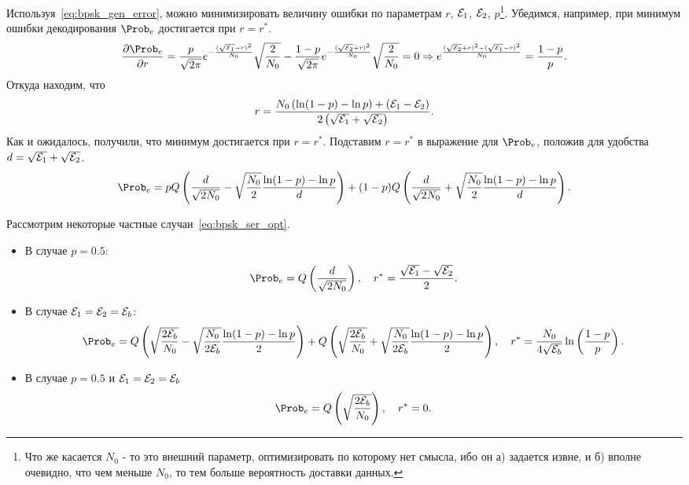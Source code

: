 \documentclass{book}
\numberwithin{theorem}{chapter}
\numberwithin{statement}{chapter}
\numberwithin{lemma}{chapter}
\theoremstyle{definition}
\numberwithin{task}{chapter}
\theoremstyle{remark}
\numberwithin{example}{chapter}
\theoremstyle{definition}
\numberwithin{definition}{chapter}
\theoremstyle{remark}
\theoremstyle{remark}
\numberwithin{lyrics}{section}
\begin{document}
Используя~\eqref{eq:bpsk_gen_error}, можно минимизировать величину ошибки по параметрам $r$, $\mathcal{E}_1$, $\mathcal{E}_2$, $p$\footnote{Что же касается $N_0$ - то это внешний параметр, оптимизировать по которому нет смысла, ибо он а) задается извне, и б) вполне очевидно, что чем меньше $N_0$, то тем больше вероятность доставки данных.}. Убедимся, например, при  минимум ошибки декодирования $\Prob_e$ достигается при $r=r^*$. 
\begin{gather}
\frac{\partial \Prob_e}{\partial r} = \frac{p}{\sqrt{2\pi}} e^{-\frac{(\sqrt{\Energy_1} - r)^2}{N_0}} \sqrt{\frac{2}{N_0}} - \frac{1 - p}{\sqrt{2\pi}} e^{-\frac{(\sqrt{\Energy_2} + r)^2}{N_0}} \sqrt{\frac{2}{N_0}} = 0 \Rightarrow
e^{\frac{(\sqrt{\Energy_2} + r)^2 - (\sqrt{\Energy_1} - r)^2}{N_0}}= \frac{1-p}{p}.
\end{gather}
Откуда находим, что
\begin{gather}
r = \frac{N_0\left(\ln (1 - p) - \ln p\right) + (\mathcal{E}_1 - \mathcal{E}_2)}{2\left(\sqrt{\mathcal{E}_1} + \sqrt{\mathcal{E}_2}\right)}.
\end{gather}
Как и ожидалось, получили, что минимум достигается при $r = r^*$. Подставим $r = r^*$ в выражение для $\Prob_e$, положив для удобства $d = \sqrt{\mathcal{E}_1} + \sqrt{\mathcal{E}_2}$.
\begin{gather}
\label{eq:bpsk_ser_opt}
\Prob_e = p Q\left(\frac{d}{\sqrt{2N_0}} - \sqrt{\frac{N_0}{2}} \frac{\ln(1-p) - \ln p}{d}\right) + (1 - p) Q\left(\frac{d}{\sqrt{2N_0}} + \sqrt{\frac{N_0}{2}} \frac{\ln(1-p) - \ln p}{d}\right).
\end{gather}

Рассмотрим некоторые частные случаи~\eqref{eq:bpsk_ser_opt}.
\begin{itemize}
\item В случае $p = 0.5$:
\begin{gather}
\Prob_e = Q\left(\frac{d}{\sqrt{2N_0}}\right), \quad r^* = \frac{\sqrt{\Energy_1} - \sqrt{\Energy_2}}{2}.
\end{gather}
\item В случае $\mathcal{E}_1 = \mathcal{E}_2 = \mathcal{E}_b$:
\begin{gather}
\Prob_e = Q\left(\sqrt{\frac{2\Energy_b}{N_0}} - \sqrt{\frac{N_0}{2\Energy_b}} \frac{\ln(1-p) - \ln p}{2}\right) + Q\left(\sqrt{\frac{2\Energy_b}{N_0}} + \sqrt{\frac{N_0}{2\Energy_b}} \frac{\ln(1-p) - \ln p}{2}\right),\quad r^* = \frac{N_0}{4\sqrt{\Energy_b}} \ln \left(\frac{1-p}{p}\right).
\end{gather}
\item В случае $p = 0.5$ и $\mathcal{E}_1 = \mathcal{E}_2 = \mathcal{E}_b$
\begin{gather}
\Prob_e = Q\left(\sqrt{\frac{2\Energy_b}{N_0}}\right), \quad r^* = 0.
\end{gather}
\end{itemize}
\end{document}
